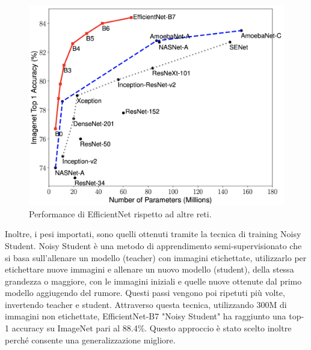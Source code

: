         \begin{figure}[H]
            \centering
            \includegraphics[scale=0.15]{Plot/efficientnet.png}
            \caption{Performance di EfficientNet rispetto ad altre reti.}
            \label{fig:efficientnet}
        \end{figure}
        
        Inoltre, i pesi importati, sono quelli ottenuti tramite la tecnica di training Noisy Student. Noisy Student è una metodo di apprendimento semi-supervisionato che si basa sull'allenare un modello (teacher) con immagini etichettate, utilizzarlo per etichettare nuove immagini e allenare un nuovo modello (student), della stessa grandezza o maggiore, con le immagini iniziali e quelle nuove ottenute dal primo modello aggiugendo del rumore. Questi passi vengono poi ripetuti più volte, invertendo teacher e student. Attraverso questa tecnica, utilizzando 300M di immagini non etichettate, EfficientNet-B7 "Noisy Student" ha raggiunto una top-1 accuracy su ImageNet pari al 88.4\%. Questo approccio è stato scelto inoltre perché consente una generalizzazione migliore. \cite{xie2020selftraining}

